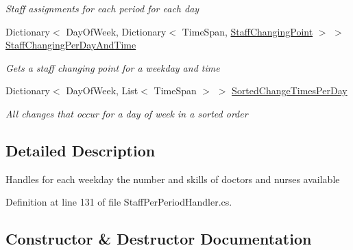 \begin{DoxyCompactItemize}
\begin{DoxyCompactList}\small\item\em Staff assignments for each period for each day \end{DoxyCompactList}\item 
Dictionary$<$ Day\+Of\+Week, Dictionary$<$ Time\+Span, \hyperlink{class_general_health_care_elements_1_1_staff_handling_1_1_staff_changing_point}{Staff\+Changing\+Point} $>$ $>$ \hyperlink{class_general_health_care_elements_1_1_staff_handling_1_1_staff_per_period_handler_a03a7e591510f8dbe271e0421b14950c9}{Staff\+Changing\+Per\+Day\+And\+Time}
\begin{DoxyCompactList}\small\item\em Gets a staff changing point for a weekday and time \end{DoxyCompactList}\item 
Dictionary$<$ Day\+Of\+Week, List$<$ Time\+Span $>$ $>$ \hyperlink{class_general_health_care_elements_1_1_staff_handling_1_1_staff_per_period_handler_a5306c250e4dd755c8e618712ccb5e660}{Sorted\+Change\+Times\+Per\+Day}
\begin{DoxyCompactList}\small\item\em All changes that occur for a day of week in a sorted order \end{DoxyCompactList}\end{DoxyCompactItemize}


\subsection{Detailed Description}
Handles for each weekday the number and skills of doctors and nurses available 



Definition at line 131 of file Staff\+Per\+Period\+Handler.\+cs.



\subsection{Constructor \& Destructor Documentation}
